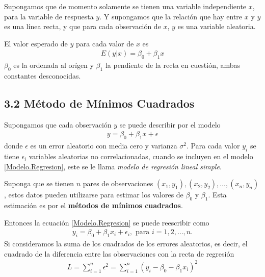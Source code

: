 Supongamos que de momento solamente se tienen una variable independiente $x$, para la variable de respuesta $y$. Y supongamos que la relaci\'on que hay entre $x$ y $y$ es una l\'inea recta, y que para cada observaci\'on de $x$, $y$ es una variable aleatoria.

El valor esperado de $y$ para cada valor de $x$ es
\begin{eqnarray}
E\left(y|x\right)=\beta_{0}+\beta_{1}x
\end{eqnarray}
$\beta_{0}$ es la ordenada al or\'igen y $\beta_{1}$ la pendiente de la recta en cuesti\'on, ambas constantes desconocidas. 





\subsection{3.2 M\'etodo de M\'inimos Cuadrados}




Supongamos que cada observaci\'on $y$ se puede describir por el modelo
\begin{eqnarray}\label{Modelo.Regresion}
y=\beta_{0}+\beta_{1}x+\epsilon
\end{eqnarray}
donde $\epsilon$ es un error aleatorio con media cero y varianza $\sigma^{2}$. Para cada valor $y_{i}$ se tiene $\epsilon_{i}$ variables aleatorias no correlacionadas, cuando se incluyen en el modelo \ref{Modelo.Regresion}, este se le llama \textit{modelo de regresi\'on lineal simple}.


Suponga que se tienen $n$ pares de observaciones $\left(x_{1},y_{1}\right),\left(x_{2},y_{2}\right),\ldots,\left(x_{n},y_{n}\right)$, estos datos pueden utilizarse para estimar los valores de $\beta_{0}$ y $\beta_{1}$. Esta estimaci\'on es por el \textbf{m\'etodos de m\'inimos cuadrados}.







Entonces la ecuaci\'on \ref{Modelo.Regresion} se puede reescribir como
\begin{eqnarray}\label{Modelo.Regresion.dos}
y_{i}=\beta_{0}+\beta_{1}x_{i}+\epsilon_{i},\textrm{ para }i=1,2,\ldots,n.
\end{eqnarray}
Si consideramos la suma de los cuadrados de los errores aleatorios, es decir, el cuadrado de la diferencia entre las observaciones con la recta de regresi\'on
\begin{eqnarray}
L=\sum_{i=1}^{n}\epsilon^{2}=\sum_{i=1}^{n}\left(y_{i}-\beta_{0}-\beta_{1}x_{i}\right)^{2}
\end{eqnarray}






